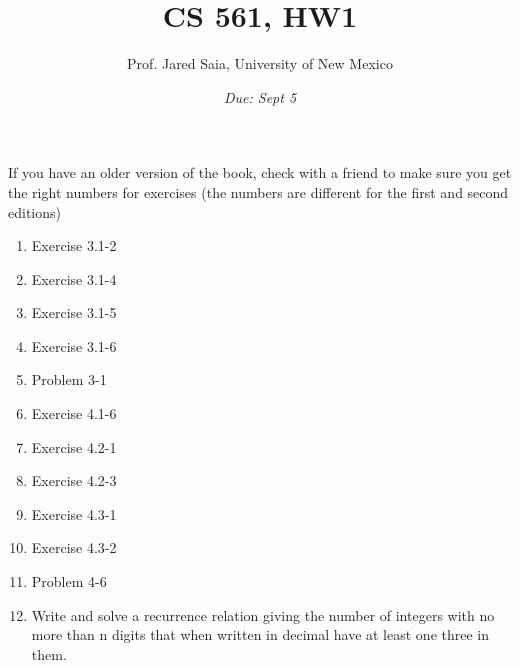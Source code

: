 \documentclass[11pt]{article}
\begin{document}
\title{CS 561, HW1}

\author {Prof. Jared Saia, University of New Mexico}

\date{\emph{Due: Sept 5}}
\maketitle

If you have an older version of the book, check with a friend to make
sure you get the right numbers for exercises (the numbers are
different for the first and second editions)

\begin{enumerate}

\item Exercise 3.1-2

\item Exercise 3.1-4

\item Exercise 3.1-5

\item Exercise 3.1-6

\item Problem 3-1

\item Exercise 4.1-6

\item Exercise 4.2-1

\item Exercise 4.2-3

\item Exercise 4.3-1

\item Exercise 4.3-2

\item Problem 4-6

\item Write and solve a recurrence relation giving the number of integers with no more than n digits that when written in decimal have at least one three in them.

\end{enumerate}
\end{document}

